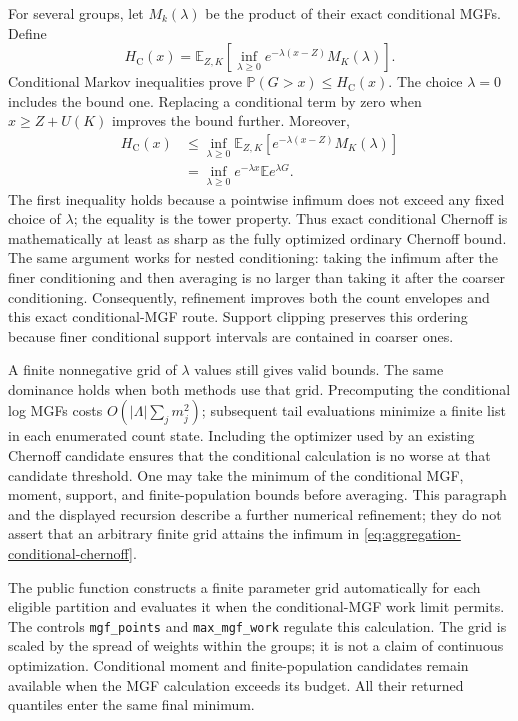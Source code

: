 \documentclass[11pt,letterpaper]{article}
\numberwithin{equation}{section}
\theoremstyle{definition}
\theoremstyle{remark}
\newcommand{\E}{\mathbb E}
\newcommand{\Pbb}{\mathbb P}
\begin{document}
For several groups, let $M_k(\lambda)$ be the product of their exact
conditional MGFs. Define
\begin{equation}
 H_{\mathrm C}(x)=\E_{Z,K}\!\left[
   \inf_{\lambda\ge0}e^{-\lambda(x-Z)}M_K(\lambda)\right].
 \label{eq:aggregation-conditional-chernoff}
\end{equation}
Conditional Markov inequalities prove $\Pbb(G>x)\le H_{\mathrm C}(x)$.
The choice $\lambda=0$ includes the bound one. Replacing a conditional
term by zero when $x\ge Z+U(K)$ improves the bound further.
Moreover,
\begin{equation}
 \begin{split}
 H_{\mathrm C}(x)
 &\le\inf_{\lambda\ge0}
      \E_{Z,K}\!\left[e^{-\lambda(x-Z)}M_K(\lambda)\right]\\
 &=\inf_{\lambda\ge0}e^{-\lambda x}\E e^{\lambda G}.
 \end{split}
 \label{eq:aggregation-chernoff-dominance}
\end{equation}
The first inequality holds because a pointwise infimum does not exceed
any fixed choice of $\lambda$; the equality is the tower property.
Thus exact conditional Chernoff is mathematically at least as sharp as
the fully optimized ordinary Chernoff bound. The same argument works
for nested conditioning: taking the infimum after the finer conditioning
and then averaging is no larger than taking it after the coarser
conditioning. Consequently, refinement improves both the count envelopes
and this exact conditional-MGF route. Support clipping preserves this
ordering because finer conditional support intervals are contained in
coarser ones.

A finite nonnegative grid of $\lambda$ values still gives valid bounds.
The same dominance holds when both methods use that grid. Precomputing
the conditional log MGFs costs $O(|\Lambda|\sum_jm_j^2)$; subsequent
tail evaluations minimize a finite list in each enumerated count state.
Including the optimizer used by an existing Chernoff candidate ensures
that the conditional calculation is no worse at that candidate threshold.
One may take the minimum of the conditional MGF, moment, support, and
finite-population bounds before averaging. This paragraph and the
displayed recursion describe a further numerical refinement; they do not
assert that an arbitrary finite grid attains the infimum in
\eqref{eq:aggregation-conditional-chernoff}.

The public function constructs a finite parameter grid automatically for
each eligible partition and evaluates it when the conditional-MGF work
limit permits. The controls \texttt{mgf\_points} and
\texttt{max\_mgf\_work} regulate this calculation. The grid is scaled by
the spread of weights within the groups; it is not a claim of continuous
optimization. Conditional moment and finite-population candidates remain
available when the MGF calculation exceeds its budget. All their returned
quantiles enter the same final minimum.
\end{document}
